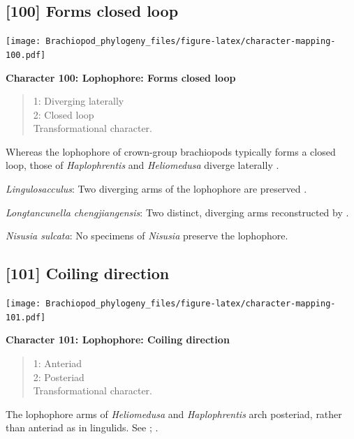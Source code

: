 \documentclass[openany]{book}
\theoremstyle{definition}
\theoremstyle{definition}
\theoremstyle{definition}
\theoremstyle{remark}
\begin{document}
\subsection*{{[}100{]} Forms closed loop}\label{forms-closed-loop}

\texttt{[image: Brachiopod\_phylogeny\_files/figure-latex/character-mapping-100.pdf]}

\textbf{Character 100: Lophophore: Forms closed loop}

\begin{quote}
1: Diverging laterally\\
2: Closed loop\\
Transformational character.
\end{quote}

Whereas the lophophore of crown-group brachiopods typically forms a
closed loop, those of \emph{Haplophrentis} and \emph{Heliomedusa}
diverge laterally \citep{Moysiuk2017Hyolithsare}.

\hypertarget{Lingulosacculus-coding-100}{}
\emph{Lingulosacculus}: Two diverging arms of the lophophore are
preserved \citep{Balthasar2009EarlyCambrian}.

\hypertarget{Longtancunella_chengjiangensis-coding-100}{}
\emph{Longtancunella chengjiangensis}: Two distinct, diverging arms
reconstructed by \citet{Zhang2007Agregarious}.

\hypertarget{Nisusia_sulcata-coding-100}{}
\emph{Nisusia sulcata}: No specimens of \emph{Nisusia} preserve the
lophophore.

\subsection*{{[}101{]} Coiling direction}\label{coiling-direction}

\texttt{[image: Brachiopod\_phylogeny\_files/figure-latex/character-mapping-101.pdf]}

\textbf{Character 101: Lophophore: Coiling direction}

\begin{quote}
1: Anteriad\\
2: Posteriad\\
Transformational character.
\end{quote}

The lophophore arms of \emph{Heliomedusa} and \emph{Haplophrentis} arch
posteriad, rather than anteriad as in lingulids. See
\citet{Zhang2009Architectureand}; \citet{Moysiuk2017Hyolithsare}.
\end{document}

